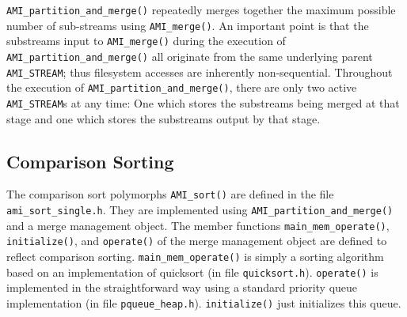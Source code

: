 \verb|AMI_partition_and_merge()| repeatedly merges together the maximum
possible number of sub-streams using \verb|AMI_merge()|. An important point
is that the substreams input to \verb|AMI_merge()| during the execution of
\verb|AMI_partition_and_merge()| all originate from the same underlying
parent \verb|AMI_STREAM|; thus filesystem accesses are inherently
non-sequential. Throughout the execution of
\verb|AMI_partition_and_merge()|, there are only two active
\verb|AMI_STREAM|s at any time: One which stores the substreams being
merged at that stage and one which stores the substreams output by that
stage.


\subsection{Comparison Sorting}
\label{sec:ref-imp-ami-sort}

\tobeextended

The comparison sort polymorphs \verb|AMI_sort()| are defined in the file
\verb|ami_sort_single.h|. They are implemented using
\verb|AMI_partition_and_merge()| and a merge management object. The member
functions \verb|main_mem_operate()|, \verb|initialize()|, and
\verb|operate()| of the merge management object are defined to reflect
comparison sorting. \verb|main_mem_operate()| is simply a sorting algorithm
based on an implementation of quicksort (in file
\verb|quicksort.h|). \verb|operate()| is implemented in the straightforward
way using a standard priority queue implementation (in file
\verb|pqueue_heap.h|). \verb|initialize()| just initializes this
queue.

